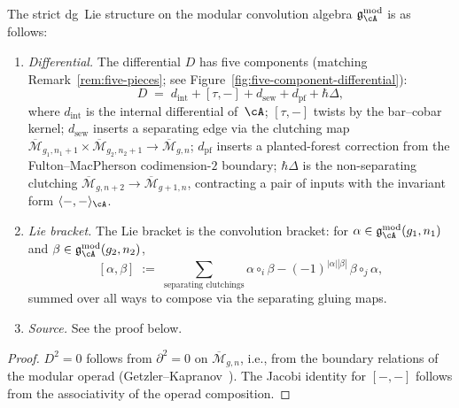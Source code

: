 \begin{theorem}
\label{thm:convolution-dg-lie-structure}
The strict dg~Lie structure on the modular convolution algebra
$\mathfrak{g}_{\cA}^{\mathrm{mod}}$ is as follows:
\begin{enumerate}[label=\textup{(\roman*)}]
\item \emph{Differential.}
  The differential $D$ has five components
  \textup{(}matching Remark~\textup{\ref{rem:five-pieces}};
  see Figure~\textup{\ref{fig:five-component-differential})}:
  \begin{equation}\label{eq:D-five-components}
  D
  \;=\;
  d_{\mathrm{int}} + [\tau,-] + d_{\mathrm{sew}}
  + d_{\mathrm{pf}} + \hbar\Delta,
  \end{equation}
  where $d_{\mathrm{int}}$ is the internal differential of~$\cA$;
  $[\tau,-]$ twists by the bar--cobar kernel;
  $d_{\mathrm{sew}}$ inserts a separating edge via the clutching
  map $\overline{\mathcal{M}}_{g_1,n_1+1} \times
  \overline{\mathcal{M}}_{g_2,n_2+1} \to
  \overline{\mathcal{M}}_{g,n}$;
  $d_{\mathrm{pf}}$ inserts a planted-forest correction from the
  Fulton--MacPherson codimension-$2$ boundary;
  $\hbar\Delta$ is the non-separating clutching
  $\overline{\mathcal{M}}_{g,n+2} \to
  \overline{\mathcal{M}}_{g+1,n}$,
  contracting a pair of inputs with the invariant form
  $\langle -, - \rangle_{\cA}$.

\item \emph{Lie bracket.}
  The Lie bracket is the convolution bracket: for
  $\alpha \in \mathfrak{g}_{\cA}^{\mathrm{mod}}(g_1,n_1)$ and
  $\beta \in \mathfrak{g}_{\cA}^{\mathrm{mod}}(g_2,n_2)$,
  \[
  [\alpha,\beta]
  \;:=\;
  \sum_{\text{separating clutchings}}
  \alpha \circ_i \beta
  - (-1)^{|\alpha||\beta|}\, \beta \circ_j \alpha,
  \]
  summed over all ways to compose via the separating gluing maps.

\item \emph{Source.}  See the proof below.
\end{enumerate}
\end{theorem}

\begin{proof}
$D^2 = 0$ follows from $\partial^2 = 0$ on
$\overline{\mathcal{M}}_{g,n}$, i.e., from the boundary
relations of the modular operad
(Getzler--Kapranov~\cite[\S5]{GeK98}).
The Jacobi identity for $[-,-]$ follows from the associativity of
the operad composition.
\end{proof}

